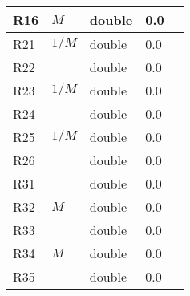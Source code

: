 \begin{tabular}{|l|l|l|l|p{\descwidth}|}
R16 & $M$ & double &  0.0 & \\ \hline 
R21 & $1/M$ & double &  0.0 & \\ \hline 
R22 &  & double &  0.0 & \\ \hline 
R23 & $1/M$ & double &  0.0 & \\ \hline 
R24 &  & double &  0.0 & \\ \hline 
R25 & $1/M$ & double &  0.0 & \\ \hline 
R26 &  & double &  0.0 & \\ \hline 
R31 &  & double &  0.0 & \\ \hline 
R32 & $M$ & double &  0.0 & \\ \hline 
R33 &  & double &  0.0 & \\ \hline 
R34 & $M$ & double &  0.0 & \\ \hline 
R35 &  & double &  0.0 & \\ \hline 
\end{tabular}

